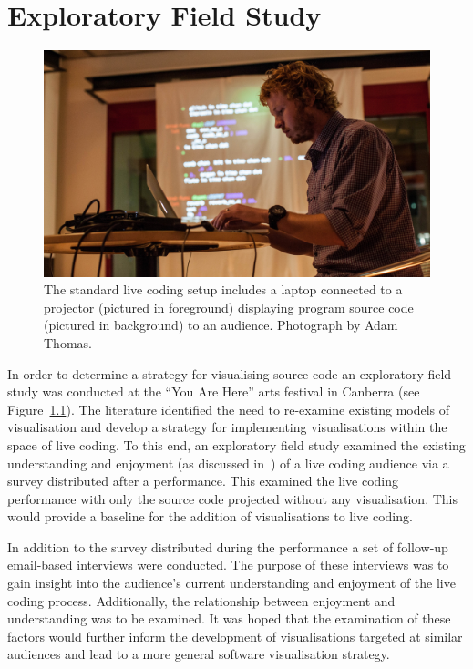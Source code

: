 
\chapter{Exploratory Field Study}
\label{chap:exploratory-field-study}

\begin{figure}
\centering
\includegraphics[width=1.0\textwidth]{../images/study-1-you-are-here-ben.jpg}
\caption[Standard live coding setup]{The standard live coding setup includes a laptop connected to a projector (pictured in foreground) displaying program source code (pictured in background) to an audience. Photograph by Adam Thomas.}
\label{fig:exploratory-field-study-ben}
\end{figure}


In order to determine a strategy for visualising source code an exploratory field study was conducted at the ``You Are Here'' arts festival in Canberra (see Figure~\ref{fig:exploratory-field-study-ben}). The literature identified the need to re-examine existing models of visualisation and develop a strategy for implementing visualisations within the space of live coding. To this end, an exploratory field study examined the existing understanding and enjoyment (as discussed in~\cite{McLean2010a}) of a live coding audience via a survey distributed after a performance. This examined the live coding performance with only the source code projected without any visualisation. This would provide a baseline for the addition of visualisations to live coding.

In addition to the survey distributed during the performance a set of follow-up email-based interviews were conducted. The purpose of these interviews was to gain insight into the audience's current understanding and enjoyment of the live coding process. Additionally, the relationship between enjoyment and understanding was to be examined. It was hoped that the examination of these factors would further inform the development of visualisations targeted at similar audiences and lead to a more general software visualisation strategy.

